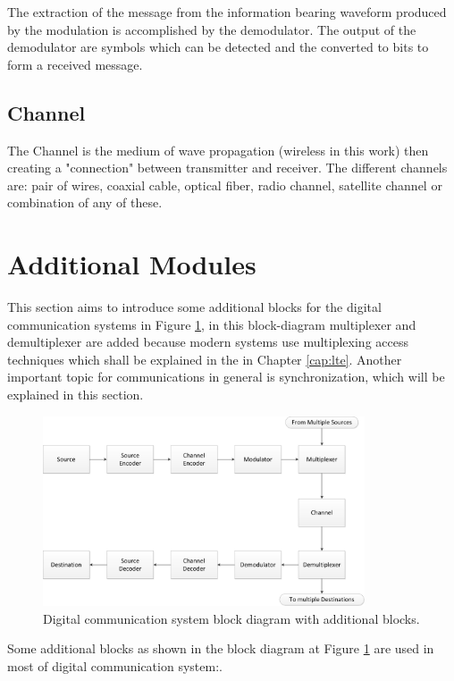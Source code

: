 The extraction of the message from the information bearing waveform produced by
the modulation is accomplished by the demodulator. The output of the demodulator
are symbols which can be detected and the converted to bits to form a received
message.

\subsection{Channel}

The Channel is the medium of wave propagation (wireless in this work) then
creating a "connection" between transmitter and receiver. The different channels
are: pair of wires, coaxial cable, optical fiber, radio channel, satellite
channel or combination of any of these.

\section{Additional Modules}

This section aims to introduce some additional blocks for the digital
communication systems in Figure \ref{fig:digicomplus}, in this block-diagram
multiplexer and demultiplexer are added because modern systems use multiplexing
access techniques which shall be explained in the in Chapter \ref{cap:lte}.
Another important topic for communications in general is synchronization, which
will be explained in this section.

\begin{figure}[htbp]
    \centering
    \includegraphics[width=0.85\textwidth]{./figures/digicom_plus}
    \caption{ Digital communication system block diagram with additional blocks.
    \label{fig:digicomplus}}
\end{figure}

Some additional blocks as shown in the block diagram  at Figure \ref{fig:digicomplus}
are used in most of digital communication system:.

